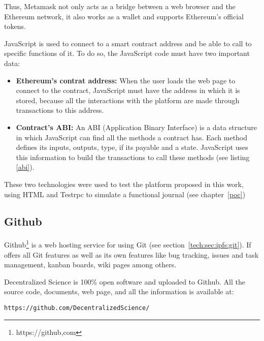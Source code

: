 Thus, Metamask not only acts as a bridge between a web browser and the Ethereum
network, it also works as a wallet and supports Ethereum's official tokens.

JavaScript is used to connect to a smart contract address and be able to call to
specific functions of it. To do so, the JavaScript code must have two important
data:

\begin{itemize}
\item \textbf{Ethereum's contrat address:} When the user loads the web page to
  connect to the contract, JavaScript must have the address in which it is
  stored, because all the interactions with the platform are made through
  transactions to this address.
\item \textbf{Contract's ABI:} An ABI (Application Binary Interface) is a data
  structure in which JavaScript can find all the methods a contract has. Each
  method defines its inputs, outputs, type, if its payable and a state.
  JavaScript uses this information to build the transactions to call these
  methods (see listing \ref{abi}).

\end{itemize}

These two technologies were used to test the platform proposed in this work,
using HTML and Testrpc to simulate a functional journal (see chapter~\ref{poc})





\subsection{Github}
\label{sec:github}

Github\footnote{https://github,com} is a web hosting service for  using
Git (see section~\ref{tech:sec:ipfs:git}). If offers all Git features as well as
its own features like bug tracking, issues and task management, kanban boards,
wiki pages among others.

Decentralized Science is 100\% open software and uploaded to Github. All the
source code, documents, web page, and all the information is available at:

\begin{lstlisting}[frame=single]
  https://github.com/DecentralizedScience/
\end{lstlisting}
